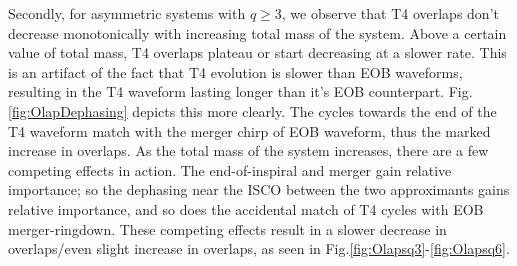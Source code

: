 \documentclass[aps,
prd,
amsmath,
amssymb,
twocolumn,
floatfix,
groupedaddress]{revtex4-1}
\begin{document}
Secondly, for asymmetric systems with $q\geq3$, we observe that T4 overlaps don't decrease monotonically with increasing total mass of the system. Above a certain value of total mass, T4 overlaps plateau or start decreasing at a slower rate. This is an artifact of the fact that T4 evolution is slower than EOB waveforms, resulting in the T4 waveform lasting longer than it's EOB counterpart. Fig.\ref{fig:OlapDephasing} depicts this more clearly. The cycles towards the end of the T4 waveform match with the merger chirp of EOB waveform, thus the marked increase in overlaps. As the total mass of the system increases, there are a few competing effects in action. The end-of-inspiral and merger gain relative importance; so the dephasing near the ISCO between the two approximants gains relative importance, and so does the accidental match of T4 cycles with EOB merger-ringdown. These competing effects result in a slower decrease in overlaps/even slight increase in overlaps, as seen in Fig.\ref{fig:Olapsq3}-\ref{fig:Olapsq6}.
\end{document}
